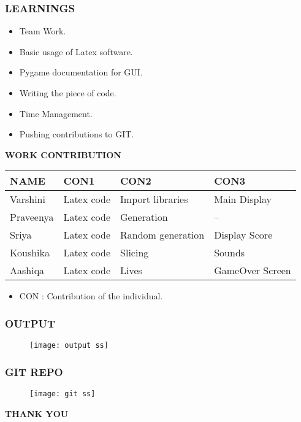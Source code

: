 \documentclass{beamer}
\begin{document}
\begin{frame}
\frametitle{\bfseries LEARNINGS}
\begin{itemize}
\item Team Work.
\item Basic usage of Latex software.
\item Pygame documentation for GUI.
\item Writing the piece of code.
\item Time Management.
\item Pushing contributions to GIT.
\end{itemize}
\end{frame}

\begin{frame}{\bfseries WORK CONTRIBUTION}
\centering
\begin{tabular}{|l|l|l|l|}
\hline
\bfseries NAME & \bfseries CON1 & \bfseries CON2 & \bfseries CON3 \\ \hline
Varshini & Latex code & Import libraries & Main Display \\ \hline
Praveenya & Latex code & Generation & -- \\ \hline
Sriya & Latex code & Random generation & Display Score \\ \hline
Koushika & Latex code & Slicing & Sounds \\ \hline
Aashiqa & Latex code & Lives & GameOver Screen \\  \hline

\end{tabular}

\begin{itemize}
\item CON : Contribution of the individual.
\end{itemize}
\end{frame}
 

 \begin{frame}
\Huge
\frametitle{\bfseries OUTPUT}
\bigskip
\begin{figure}
 \texttt{[image: output ss]} 
\end{figure}
\end{frame}

 \begin{frame}
\Huge
\frametitle{\bfseries GIT REPO}
\bigskip
\begin{figure}
 \texttt{[image: git ss]} 
\end{figure}
\end{frame}







 \begin{frame}
 \Huge\centerline{\bfseries THANK YOU}
 \end{frame}
 
\end{document}
